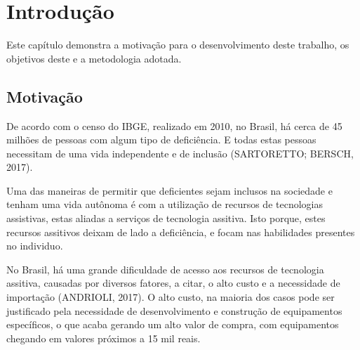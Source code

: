 \chapter[Introdução]{Introdução}


Este capítulo demonstra a motivação para o desenvolvimento deste trabalho, os objetivos deste e a metodologia adotada.

\section{Motivação} %

\par De acordo com o censo do IBGE, realizado em 2010, no Brasil, há cerca de 45 milhões de pessoas com algum tipo de deficiência. E todas estas pessoas necessitam de uma vida independente e de inclusão (SARTORETTO; BERSCH, 2017).

\par Uma das maneiras de permitir que deficientes sejam inclusos na sociedade e tenham uma vida autônoma é com a utilização de  recursos de tecnologias assistivas, estas aliadas a serviços de tecnologia assitiva. Isto porque, estes recursos assitivos deixam de lado a deficiência, e focam nas habilidades presentes no individuo.

\par No Brasil, há uma grande dificuldade de acesso aos recursos de tecnologia assitiva, causadas por diversos fatores, a citar, o alto custo e a necessidade de importação (ANDRIOLI, 2017). O alto custo, na maioria dos casos pode ser justificado pela necessidade de desenvolvimento e construção de equipamentos específicos, o que acaba gerando um alto valor de compra, com equipamentos chegando em valores próximos a 15 mil reais.


